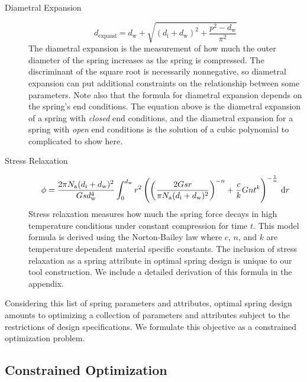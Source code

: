 \documentclass[10pt]{article}
\begin{document}
\begin{description}
			\item[Diametral Expansion]\begin{equation} d_{\text{expand}} = d_{\text{w}} + \sqrt{(d_{\text{i}} + d_{\text{w}})^{2} + \frac{p^{2} - d_{\text{w}}}{\pi^{2}}}
			\end{equation}
				The diametral expansion is the measurement of how much the outer diameter of the spring increases as the spring is compressed. The discriminant of the square root is necessarily nonnegative, so diametral expansion can put additional constraints on the relationship between some parameters. Note also that the formula for diametral expansion depends on the spring's end conditions. The equation above is the diametral expansion of a spring with \textit{closed} end conditions, and the diametral expansion for a spring with \textit{open} end conditions is the solution of a cubic polynomial to complicated to show here.
						
			\item[Stress Relaxation]\begin{equation} \phi = \frac{2\pi N_{\text{a}} (d_{\text{i}}+d_{\text{w}})^2}{Gsd_{\text{w}}^4}\int_0^{d_\text{w}} r^2 \left(\left(\frac{2Gsr}{\pi N_{\text{a}} (d_{\text{i}}+d_{\text{w}})^2}\right)^{-n} + {c\over k} Gnt^k \right)^{-{1\over n}} \,\mathrm{d} r \end{equation}
				Stress relaxation measures how much the spring force decays in high temperature conditions under constant compression for time $t$. This model formula is derived using the Norton-Bailey law where $c$, $n$, and $k$ are temperature dependent material specific constants. The inclusion of stress relaxation as a spring attribute in optimal spring design is unique to our tool construction. We include a detailed derivation of this formula in the appendix.
						
			\end{description}
			
Considering this list of spring parameters and attributes, optimal spring design amounts to optimizing a collection of parameters and attributes subject to the restrictions of design specifications. We formulate this objective as a constrained optimization problem.

\subsection{Constrained Optimization}
\label{sec:Constrained_Optimization}
\end{document}
